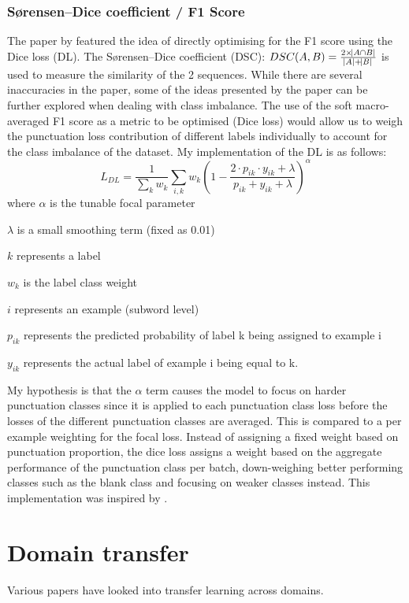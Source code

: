 \documentclass[a4paper]{article}
\begin{document}
\begin{multicols}{2}
\subsubsection{Sørensen–Dice coefficient / F1 Score} \label{DL}
The paper by \citet{li2020dice} featured the idea of directly optimising for the F1 score using the Dice loss  (DL). The Sørensen–Dice coefficient (DSC): $DSC(A,B)=\frac{2 \times\abs{A \cap B}}{\abs{A} + \abs{B}}$ is used to measure the similarity of the 2 sequences. While there are several inaccuracies in the paper, some of the ideas presented by the paper can be further explored when dealing with class imbalance. The use of the soft macro-averaged F1 score as a metric to be optimised (Dice loss) would allow us to weigh the punctuation loss contribution of different labels individually to account for the class imbalance of the dataset. My implementation of the DL is as follows:
\[L_{DL}=\frac{1}{\sum_k{w_k}}\sum_{i,k}{w_k(1-\frac{2\cdot p_{ik}\cdot y_{ik}+\lambda}{p_{ik}+ y_{ik}+\lambda})^{\alpha}}
\] where $\alpha$ is the tunable focal parameter

$\lambda$ is a small smoothing term (fixed as 0.01)

$k$ represents a label

$w_k$ is the label class weight

$i$ represents an example (subword level)

$p_{ik}$ represents the predicted probability of label k being assigned to example i

$y_{ik}$ represents the actual label of example i being equal to k.

My hypothesis is that the $\alpha$ term causes the model to focus on harder punctuation classes since it is applied to each punctuation class loss before the losses of the different punctuation classes are averaged. This is compared to a per example weighting for the focal loss. Instead of assigning a fixed weight based on punctuation proportion, the dice loss assigns a weight based on the aggregate performance of the punctuation class per batch, down-weighing better performing classes such as the blank class and focusing on weaker classes instead. This implementation was inspired by \citet{focaltversky}.

\section{Domain transfer}
Various papers have looked into transfer learning across domains.

\end{multicols}
\end{document}
